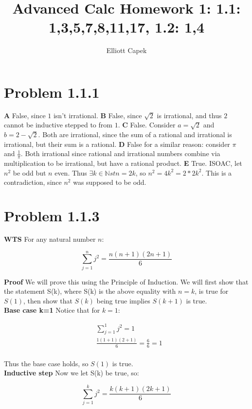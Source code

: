 \documentclass[10pt]{article} %
\title{Advanced Calc Homework \large 1: 1.1: 1,3,5,7,8,11,17, 1.2: 1,4}
\author{Elliott Capek}
\begin{document}
\maketitle{}

\section{Problem 1.1.1}
\textbf{A} False, since $1$ isn't irrational.
\textbf{B} False, since $\sqrt{2}$ is irrational, and thus $2$ cannot be inductive stepped to from $1$.
\textbf{C} False. Consider $a = \sqrt{2}$ and $b = 2 - \sqrt{2}$. Both are irrational, since the sum of a rational and irrational is irrational, but their sum is a rational.
\textbf{D} False for a similar reason: consider $\pi$ and $\frac{1}{\pi}$. Both irrational since rational and irrational numbers combine via multiplication to be irrational, but have a rational product.
\textbf{E} True. ISOAC, let $n^2$ be odd but $n$ even. Thus $\exists k\in\mathbb{N} st n=2k$, so $n^2 = 4k^2 = 2*2k^2$. This is a contradiction, since $n^2$ was supposed to be odd.\\

\section{Problem 1.1.3}
\textbf{WTS} For any natural number $n$:

\begin{equation*}
  \sum_{j=1}^{n} j^2 = \frac{n(n+1)(2n+1)}{6}
\end{equation*}

\textbf{Proof}
We will prove this using the Principle of Induction. We will first show that the statement S(k), where S(k) is the above equality with $n=k$, is true for $S(1)$, then show that $S(k)$ being true implies $S(k+1)$ is true.\\

\textbf{Base case k=1}
Notice that for $k=1$:

\begin{align*}
  &\sum_{j=1}^{1} j^2 = 1\\
  &\frac{1(1+1)(2+1)}{6} = \frac66 = 1\\
\end{align*}

Thus the base case holds, so $S(1)$ is true.\\

\textbf{Inductive step}
Now we let S(k) be true, so:

\begin{equation*}
  \sum_{j=1}^{k} j^2 = \frac{k(k+1)(2k+1)}{6}
\end{equation*}
\end{document}
